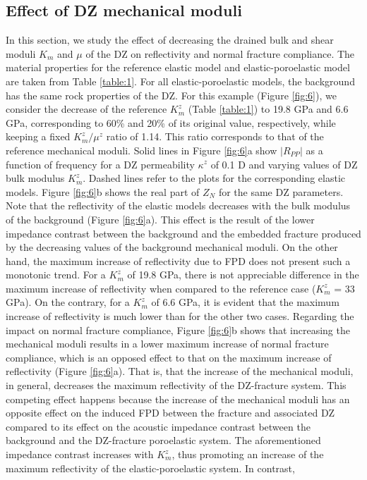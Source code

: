 \documentclass[draft]{agujournal2019}
\begin{document}
\subsection{Effect of DZ mechanical moduli}
In this section, we study the effect of decreasing the drained bulk and shear moduli  $K_m$ and $\mu$ of the DZ  on reflectivity and normal fracture compliance. The material properties for the reference elastic model and elastic-poroelastic model are taken from Table \ref{table:1}. For all elastic-poroelastic models, the background has the same rock properties of the DZ.
For this example  (Figure \ref{fig:6}), we consider the decrease of the reference $K_m^z$ (Table \ref{table:1}) to 19.8 GPa and 6.6 GPa, corresponding to  60\%  and 20\% of its original value, respectively,  while keeping a fixed $K_m^z/\mu^z$ ratio of 1.14. This ratio corresponds to that of the reference mechanical moduli.
Solid lines in Figure \ref{fig:6}a show  $|R_{PP}|$ as a function of frequency for a DZ permeability $ \kappa^z $ of 0.1 D and varying values of DZ bulk modulus $K_m^z$. Dashed lines refer to the plots for the corresponding elastic models.
Figure \ref{fig:6}b shows the real part of $Z_N$ for the same DZ parameters. Note that the reflectivity of the elastic models decreases with the bulk modulus of the background (Figure \ref{fig:6}a). This effect is the result of the lower impedance  contrast between the background and the embedded fracture produced by the decreasing values of the background mechanical moduli. On the other hand, the maximum increase of reflectivity due to FPD does not present such a  monotonic trend.
For a  $K_m^z$ of 19.8 GPa, there is not appreciable difference in the maximum increase of reflectivity when compared to the  reference case ($K_m^z$ = 33 GPa). On the contrary, for a  $K_m^z$ of 6.6 GPa, it is evident that the maximum increase of reflectivity is much lower than for the other two cases. Regarding the impact on normal fracture compliance, Figure \ref{fig:6}b shows that increasing the mechanical moduli results in a lower maximum increase of normal fracture compliance, which is an opposed effect to that on the maximum increase of reflectivity (Figure \ref{fig:6}a). That is, that the increase of the mechanical moduli, in general, decreases the maximum reflectivity of the DZ-fracture system.
This competing effect happens because the increase of the mechanical  moduli has an opposite effect on the induced FPD between the fracture and associated DZ compared to its effect on the acoustic impedance contrast  between the background and the DZ-fracture poroelastic system. The aforementioned impedance contrast increases with $K_m^z$, thus promoting an increase of the maximum reflectivity of the elastic-poroelastic system. In contrast,
\end{document}

